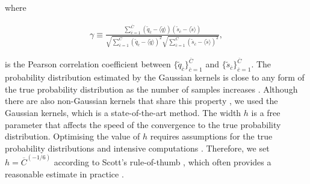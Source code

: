 \documentclass[fleqn,10pt]{wlscirep}
\begin{document}
where   
\begin{linenomath}
\begin{align}
    \label{eq:pearson}
    \gamma \equiv \frac{
            \sum_{{\overline{c}}=1}^{\overline{C}} \left( \tilde q_{{\overline{c}}} - \langle \tilde q\rangle \right)\left( \tilde s_{{\overline{c}}} - \langle \tilde s\rangle  \right) 
            }{ 
                \sqrt{\sum_{{\overline{c}}=1}^{\overline{C}} \left( \tilde q_{{\overline{c}}} - \langle \tilde q\rangle \right)^2}
                \sqrt{\sum_{{\overline{c}}=1}^{\overline{C}} \left( \tilde s_{{\overline{c}}} - \langle \tilde s\rangle \right)^2}
            },  
\end{align}
\end{linenomath}
is the Pearson correlation coefficient between $\{ \tilde q_{{\overline{c}}} \}_{{\overline{c}}=1} ^{\overline{C}} $ and $\{ \tilde s _{{\overline{c}}} \}_{{\overline{c}}=1} ^{\overline{C}} $.
The probability distribution estimated by the Gaussian kernels is close to any form of the true probability distribution as the number of samples increases \cite{Parzen1962}.
Although there are also non-Gaussian kernels that share this property \cite{Parzen1962}, we used the Gaussian kernels, which is a state-of-the-art method.
The width $h$ is a free parameter that affects the speed of the convergence to the true probability distribution.
Optimising the value of $h$ requires assumptions for the true probability distributions and intensive computations \cite{Park1990,Jones1996}.
Therefore, we set $h=\overline{C}^{(-1/6)}$ according to Scott's rule-of-thumb \cite{Scott2012}, which often provides a reasonable estimate in practice \cite{Park1990,Jones1996,Scott2012}.
\end{document}
